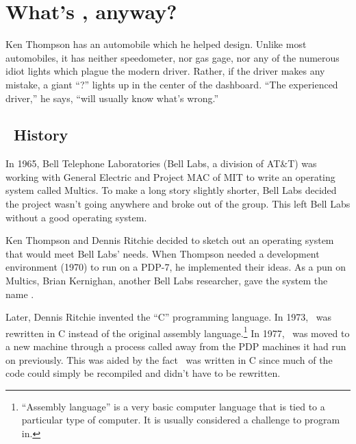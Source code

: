 \chapter{What's \unix, anyway?}\label{unixinfo}

\begin{fortune}
Ken Thompson has an automobile which he helped
design.  Unlike most automobiles, it has neither speedometer, nor gas
gage, nor any of the numerous idiot lights which plague the modern
driver.  Rather, if the driver makes any mistake, a giant ``?'' lights
up in the center of the dashboard.  ``The experienced driver,'' he
says, ``will usually know what's wrong.''
\end{fortune}

\section{\unix\ History}
In 1965, Bell Telephone Laboratories (Bell Labs, a division of
AT\&T) was working with General
Electric and Project MAC of
MIT to write an operating
system called Multics. To make a long story slightly
shorter, Bell Labs decided the project wasn't going anywhere and broke
out of the group.  This left Bell Labs without a good operating
system.

Ken Thompson and Dennis Ritchie decided to sketch out an operating system that would meet
Bell Labs' needs.  When Thompson needed a development environment
(1970) to run on a PDP-7, he implemented their ideas.  As a pun on
Multics, Brian Kernighan, another Bell Labs
researcher, gave the system the name \unix.

Later, Dennis Ritchie invented the ``C''
programming language. In 1973, \unix\ was rewritten in C instead of
the original assembly language.\footnote{``Assembly language'' is a
  very basic computer language that is tied to a particular type of
  computer.  It is usually considered a challenge to program in.} In
1977, \unix\ was moved to a new machine through a process called
 away from the PDP machines it had run on previously.
This was aided by the fact \unix\ was written in C since much of the
code could simply be recompiled and didn't have to be rewritten.

